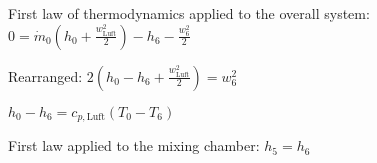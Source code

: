 First law of thermodynamics applied to the overall system:  
\( 0 = \dot{m}_0 \left( h_0 + \frac{w_{\text{Luft}}^2}{2} \right) - h_6 - \frac{w_6^2}{2} \)  

Rearranged:  
\( 2 \left( h_0 - h_6 + \frac{w_{\text{Luft}}^2}{2} \right) = w_6^2 \)  

\( h_0 - h_6 = c_{p,\text{Luft}} \left( T_0 - T_6 \right) \)  

First law applied to the mixing chamber:  
\( h_5 = h_6 \)